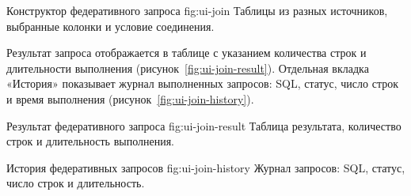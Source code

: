\documentclass[../main.tex]{subfiles}
\begin{document}
  {Конструктор федеративного запроса}
  {fig:ui-join}
  {Таблицы из разных источников, выбранные колонки и условие
   соединения.}

Результат запроса отображается в таблице с указанием количества
строк и длительности выполнения (рисунок~\ref{fig:ui-join-result}).
Отдельная вкладка «История» показывает журнал выполненных запросов:
SQL, статус, число строк и время выполнения
(рисунок~\ref{fig:ui-join-history}).

  {Результат федеративного запроса}
  {fig:ui-join-result}
  {Таблица результата, количество строк и длительность выполнения.}

  {История федеративных запросов}
  {fig:ui-join-history}
  {Журнал запросов: SQL, статус, число строк и длительность.}
\end{document}
